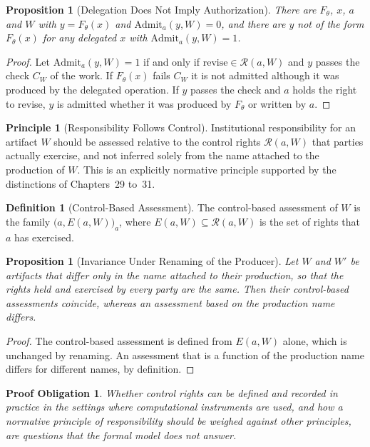 \documentclass[11pt,letterpaper]{report}
\theoremstyle{plain}
\newtheorem{proposition}[theorem]{Proposition}
\newtheorem{obligation}[theorem]{Proof Obligation}
\theoremstyle{definition}
\newtheorem{definition}[theorem]{Definition}
\newtheorem{principle}[theorem]{Principle}
\theoremstyle{remark}
\begin{document}
\begin{proposition}[Delegation Does Not Imply Authorization]\label{pr:delegation}
There are $F_\theta$, $x$, $a$ and $W$ with $y=F_\theta(x)$ and $\mathrm{Admit}_a(y,W)=0$, and there are $y$ not of the form $F_\theta(x)$ for any delegated $x$ with $\mathrm{Admit}_a(y,W)=1$.
\end{proposition}
\begin{proof}
Let $\mathrm{Admit}_a(y,W)=1$ if and only if $\mathrm{revise}\in\mathcal R(a,W)$ and $y$ passes the check $C_W$ of the work. If $F_\theta(x)$ fails $C_W$ it is not admitted although it was produced by the delegated operation. If $y$ passes the check and $a$ holds the right to revise, $y$ is admitted whether it was produced by $F_\theta$ or written by $a$.
\end{proof}

\begin{principle}[Responsibility Follows Control]\label{pr:respcontrol}
Institutional responsibility for an artifact $W$ should be assessed relative to the control rights $\mathcal R(a,W)$ that parties actually exercise, and not inferred solely from the name attached to the production of $W$. This is an explicitly normative principle supported by the distinctions of Chapters~29 to~31.
\end{principle}

\begin{definition}[Control-Based Assessment]
The control-based assessment of $W$ is the family $\bigl(a,E(a,W)\bigr)_a$, where $E(a,W)\subseteq\mathcal R(a,W)$ is the set of rights that $a$ has exercised.
\end{definition}

\begin{proposition}[Invariance Under Renaming of the Producer]\label{pr:renaming}
Let $W$ and $W'$ be artifacts that differ only in the name attached to their production, so that the rights held and exercised by every party are the same. Then their control-based assessments coincide, whereas an assessment based on the production name differs.
\end{proposition}
\begin{proof}
The control-based assessment is defined from $E(a,W)$ alone, which is unchanged by renaming. An assessment that is a function of the production name differs for different names, by definition.
\end{proof}

\begin{obligation}\label{ob:sovereignty}
Whether control rights can be defined and recorded in practice in the settings where computational instruments are used, and how a normative principle of responsibility should be weighed against other principles, are questions that the formal model does not answer.
\end{obligation}
\end{document}

